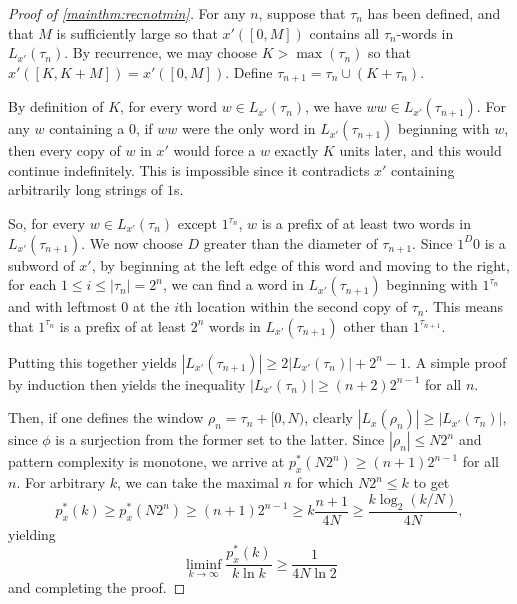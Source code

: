 \documentclass[11pt,reqno]{amsart}
\theoremstyle{definition}
\theoremstyle{plain}
\newcommand{\AuthornoteA}[2]{{\sf\small\color{magenta}{[#1: #2]}}}
\newcommand{\AuthornoteR}[2]{{\sf\small\color{blue}{[#1: #2]}}}
\newcommand{\Anote}{\AuthornoteA{A}}
\newcommand{\rp}{\AuthornoteR{R}}
\begin{document}
\begin{proof}[Proof of \cref{mainthm:recnotmin}]
For any $n$, suppose that $\tau_n$ has been defined, and that $M$ is sufficiently large so that
$x'([0, M])$ contains all $\tau_n$-words in $L_{x'}(\tau_n)$. By recurrence, we may choose 
$K > \max(\tau_n)$ so that $x'([K, K+M]) = x'([0, M])$. Define $\tau_{n+1} = \tau_n \cup (K + \tau_n)$.

By definition of $K$, for every word $w \in L_{x'}(\tau_n)$, we have $ww \in L_{x'}(\tau_{n+1})$. 
For any $w$ containing a $0$, if $ww$ were the only word in $L_{x'}(\tau_{n+1})$ beginning with $w$, then every copy of $w$ in $x'$ would force a $w$ exactly $K$ units later, and this would continue indefinitely. This is impossible since it contradicts $x'$ containing arbitrarily long strings of $1$s. 

So, for every $w \in L_{x'}(\tau_n)$ except $1^{\tau_n}$, $w$ is a prefix of at least two words in 
$L_{x'}(\tau_{n+1})$. We now choose $D$ greater than the diameter of $\tau_{n+1}$. Since $1^D 0$ is a subword of $x'$, by beginning at the left edge of this word and moving to the right, for each $1 \leq i \leq |\tau_n| = 2^n$, we can find a word in $L_{x'}(\tau_{n+1})$ beginning with $1^{\tau_n}$ and with leftmost $0$ at the $i$th location within the second copy of $\tau_n$. %
This means that $1^{\tau_n}$ is a prefix of at least $2^n$ words in $L_{x'}(\tau_{n+1})$ other than $1^{\tau_{n+1}}$. 

Putting this together yields $|L_{x'}(\tau_{n+1})| \geq 2|L_{x'}(\tau_n)| + 2^n - 1$. A simple proof by induction then yields the inequality $|L_{x'}(\tau_n)| \geq (n+2) 2^{n-1}$ for all $n$.

Then, if one defines the window $\rho_n = \tau_n + [0,N)$, clearly $|L_x(\rho_n)| \geq |L_{x'}(\tau_n)|$, since $\phi$ is a surjection from the former set to the latter. Since $|\rho_n| \leq N 2^n$ and pattern complexity is monotone, we arrive at $p^*_x(N 2^n) \geq (n+1) 2^{n-1}$ for all $n$. For arbitrary $k$, we can take the maximal $n$ for which $N 2^n \leq k$ to get
\[
    p^*_x(k) \geq p^*_x(N 2^n) \geq (n+1) 2^{n-1} \geq k \frac{n+1}{4N} \geq \frac{k \log_2 (k/N)}{4N},
\] 
yielding 
\[
    \liminf_{k \to \infty} \frac{p^*_x(k)}{k \ln k} \geq \frac{1}{4N\ln 2}
\]
and completing the proof.
\end{proof}

\end{document}
